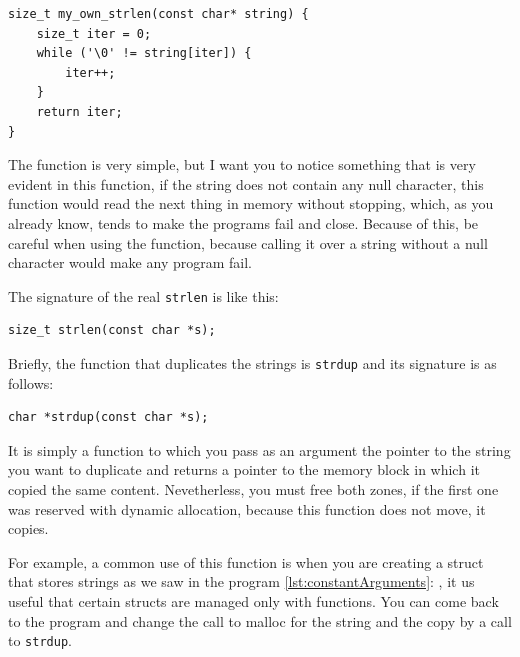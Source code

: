 \documentclass[a4paper]{article}
\begin{document}
\noindent
\begin{minipage}[H]{\linewidth}
\mbox{}
\begin{lstlisting}[style=C,
caption={Propia versión de \texttt{strlen}},
label={lst:ownStrlen}]
size_t my_own_strlen(const char* string) {
    size_t iter = 0;
    while ('\0' != string[iter]) {
        iter++;
    }
    return iter;
}
\end{lstlisting}
\end{minipage}

The function is very simple, but I want you to notice something that is very
evident in this function, if the string does not contain any null character,
this function would read the next thing in memory without stopping, which,
as you already know, tends to make the programs fail and close. Because of this,
be careful when using the function, because calling it over a string without
a null character would make any program fail.

The signature of the real \verb!strlen! is like this:

\noindent
\begin{minipage}[H]{\linewidth}
\mbox{}
\begin{lstlisting}[style=C,
caption={Signature of function \texttt{strlen}},
label={lst:memcpy}]
size_t strlen(const char *s);
\end{lstlisting}
\end{minipage}

Briefly, the function that duplicates the strings is \verb!strdup! and its
signature is as follows:

\noindent
\begin{minipage}[H]{\linewidth}
\mbox{}
\begin{lstlisting}[style=C,
caption={Definición de \texttt{strdup}},
label={lst:ownStrlen}]
char *strdup(const char *s);
\end{lstlisting}
\end{minipage}

It is simply a function to which you pass as an argument the pointer to the
string you want to duplicate and returns a pointer to the memory block in which
it copied the same content. Nevetherless, you must free both zones, if the first
one was reserved with dynamic allocation, because this function does not move,
it copies.

For example, a common use of this function is when you are creating a struct
that stores strings as we saw in the program \ref{lst:constantArguments}:
, it us useful that certain structs are managed
only with functions. You can come back to the program and change the call to
malloc for the string and the copy by a call to \verb!strdup!.
\end{document}

